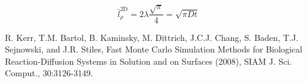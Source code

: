 \documentclass[aps,superscriptaddress,preprint,amsmath,floatfix,byrevtex]{article}
\newcommand{\lrbar}{\bar{l}_{\rho}^{\mathrm{2D}}}
\begin{document}
\begin{equation}
\boxed{
\lrbar = 2 \lambda \frac{\sqrt{\pi}}{4} = \sqrt{\pi D t}
}
\end{equation}

\begin{thebibliography}{99}
 R. Kerr, T.M. Bartol, B. Kaminsky, M. Dittrich, J.C.J. Chang, S. Baden, 
T.J. Sejnowski, and J.R. Stiles, Fast Monte Carlo Simulation Methods for Biological 
Reaction-Diffusion Systems in Solution and on Surfaces (2008),
SIAM J. Sci. Comput., 30:3126-3149. 
\end{thebibliography}
\end{document}
